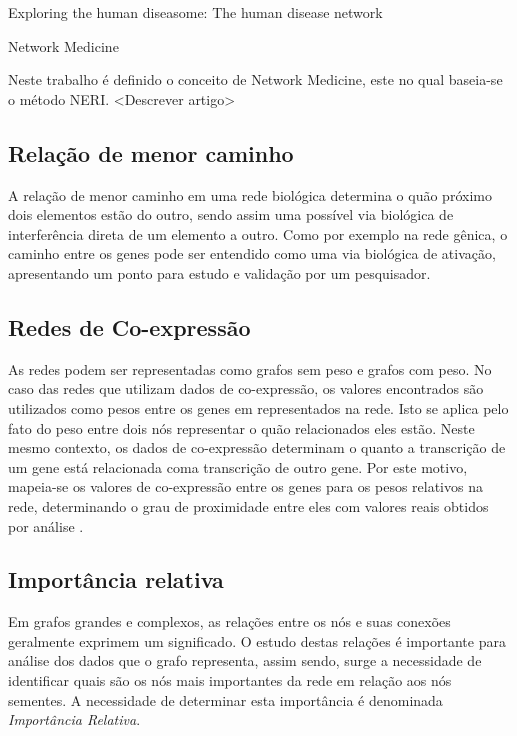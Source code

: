 	
	
	Exploring the human diseasome: The human disease network 
	\cite{Goh2012}
	
	
	Network Medicine
	\cite{Barabasi2003}
	
	Neste trabalho é definido o conceito de Network Medicine, este no qual baseia-se o método NERI.
<Descrever artigo>



\subsection{Relação de menor caminho}

A relação de menor caminho em uma rede biológica determina o quão próximo dois elementos estão do outro, sendo assim uma possível via biológica de interferência direta de um elemento a outro. Como por exemplo na rede gênica, o caminho entre os genes pode ser entendido como uma via biológica de ativação, apresentando um ponto para estudo e validação por um pesquisador.

\subsection{Redes de Co-expressão}
As redes podem ser representadas como grafos sem peso e grafos com peso. No caso das redes que utilizam dados de co-expressão, os valores encontrados são utilizados como pesos entre os genes em representados na rede. Isto se aplica pelo fato do peso entre dois nós representar o quão relacionados eles estão. Neste mesmo contexto, os dados de co-expressão determinam o quanto a transcrição de um gene está relacionada coma transcrição de outro gene. Por este motivo, mapeia-se os valores de co-expressão entre os genes para os pesos relativos na rede, determinando o grau de proximidade entre eles com valores reais obtidos por análise \cite{Gaiteri2014}.


\subsection{Importância relativa}

Em grafos grandes e complexos, as relações entre os nós e suas conexões geralmente exprimem um significado. O estudo destas relações é importante para análise dos dados que o grafo representa, assim sendo,
surge a necessidade de identificar quais são os nós mais importantes da rede em relação aos nós sementes. A necessidade de determinar esta importância é denominada \textsl{Importância Relativa}. 
%

